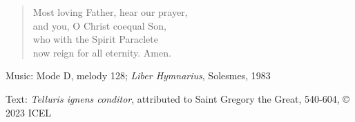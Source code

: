 \hymn



\setlength{\leftmargini}{2em}
\begin{verse}
Most loving Father, hear our prayer,\\
and you, O Christ coequal Son,\\
who with the Spirit Paraclete\\
now reign for all eternity. Amen.
\end{verse}
\setlength{\leftmargini}{\defleftmargini}

\begin{hymnsource}
Music: Mode D, melody 128; \emph{Liber Hymnarius}, Solesmes, 1983

Text: \emph{Telluris ignens conditor}, attributed to Saint Gregory the Great, 540-604, © 2023 ICEL
\end{hymnsource}
